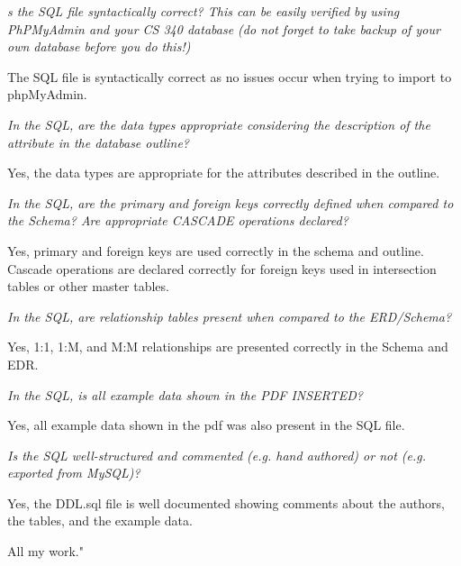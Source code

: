 \documentclass{article}
\begin{document}
\begin{tcolorbox}[colback=secondarycolor, colframe=primarycolor, title=\textbf{Step 2: Peer Review 2 - Daniel Guardado}]
\vspace{0.2cm}
\textit{s the SQL file syntactically correct? This can be easily verified by using PhPMyAdmin and your CS 340 database (do not forget to take backup of your own database before you do this!)}

\vspace{0.2cm}
The SQL file is syntactically correct as no issues occur when trying to import to phpMyAdmin. 

\vspace{0.2cm}
\textit{In the SQL, are the data types appropriate considering the description of the attribute in the database outline?}

\vspace{0.2cm}
Yes, the data types are appropriate for the attributes described in the outline. 

\vspace{0.2cm}
\textit{In the SQL, are the primary and foreign keys correctly defined when compared to the Schema? Are appropriate CASCADE operations declared?}

\vspace{0.2cm}
Yes, primary and foreign keys are used correctly in the schema and outline. Cascade operations are declared correctly for foreign keys used in intersection tables or other master tables. 

\vspace{0.2cm}
\textit{In the SQL, are relationship tables present when compared to the ERD/Schema?}

\vspace{0.2cm}
Yes, 1:1, 1:M, and M:M relationships are presented correctly in the Schema and EDR. 

\vspace{0.2cm}
\textit{In the SQL, is all example data shown in the PDF INSERTED?}

\vspace{0.2cm}
Yes, all example data shown in the pdf was also present in the SQL file. 

\vspace{0.2cm}
\textit{Is the SQL well-structured and commented (e.g. hand authored) or not (e.g. exported from MySQL)?}

\vspace{0.2cm}
Yes, the DDL.sql file is well documented showing comments about the authors, the tables, and the example data. 
 
\vspace{0.2cm}
All my work."

\vspace{0.2cm}
\end{tcolorbox}
\end{document}
